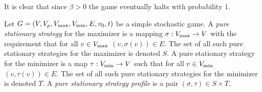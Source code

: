 It is clear that since $\beta > 0$ the game eventually halts with probability $1$. 
\begin{definition}
  Let $G = (V, V_p, V_{\max}, V_{\min}, E, v_0, t)$ be a simple stochastic game. A \emph{pure stationary strategy}
  for the maximizer is a mapping $\sigma : V_{\max} \to V$ with the requirement that for all $v \in V_{\max}$
  $(v, \sigma(v)) \in E$. The set of all such pure stationary strategies for the maximizer is denoted
  $S$. A pure stationary strategy for the minimizer is a map $\tau : V_{\min} \to V$ such that
  for all $v \in V_{\min}$ 
  $(v, \tau(v)) \in E$. The set of all such pure stationary strategies for the minimizer is denoted $T$. 
  A \emph{pure stationary strategy profile} is a pair $(\sigma, \tau) \in S \times T$.
\end{definition}

